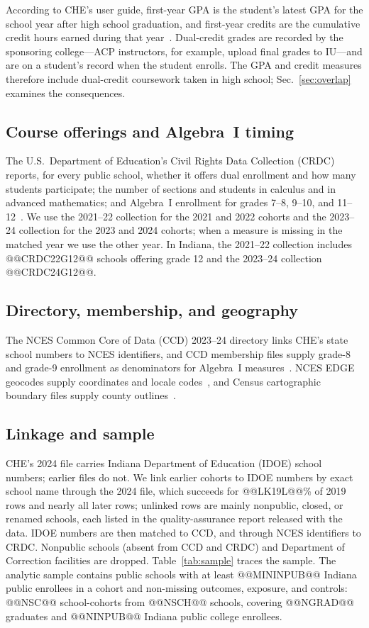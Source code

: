 \documentclass[aps,prd,reprint,superscriptaddress,nofootinbib,floatfix]{revtex4-2}
\begin{document}
According to CHE's user guide, first-year GPA is the student's latest GPA for the school year after high school graduation, and first-year credits are the cumulative credit hours earned during that year~\cite{cheguide}. Dual-credit grades are recorded by the sponsoring college---ACP instructors, for example, upload final grades to IU---and are on a student's record when the student enrolls. The GPA and credit measures therefore include dual-credit coursework taken in high school; Sec.~\ref{sec:overlap} examines the consequences.

\subsection{Course offerings and Algebra~I timing}

The U.S.\ Department of Education's Civil Rights Data Collection (CRDC) reports, for every public school, whether it offers dual enrollment and how many students participate; the number of sections and students in calculus and in advanced mathematics; and Algebra~I enrollment for grades 7--8, 9--10, and 11--12~\cite{crdc}. We use the 2021--22 collection for the 2021 and 2022 cohorts and the 2023--24 collection for the 2023 and 2024 cohorts; when a measure is missing in the matched year we use the other year. In Indiana, the 2021--22 collection includes @@CRDC22G12@@ schools offering grade 12 and the 2023--24 collection @@CRDC24G12@@.

\subsection{Directory, membership, and geography}

The NCES Common Core of Data (CCD) 2023--24 directory links CHE's state school numbers to NCES identifiers, and CCD membership files supply grade-8 and grade-9 enrollment as denominators for Algebra~I measures~\cite{ccd}. NCES EDGE geocodes supply coordinates and locale codes~\cite{edge}, and Census cartographic boundary files supply county outlines~\cite{census}.

\subsection{Linkage and sample}

CHE's 2024 file carries Indiana Department of Education (IDOE) school numbers; earlier files do not. We link earlier cohorts to IDOE numbers by exact school name through the 2024 file, which succeeds for @@LK19L@@\% of 2019 rows and nearly all later rows; unlinked rows are mainly nonpublic, closed, or renamed schools, each listed in the quality-assurance report released with the data. IDOE numbers are then matched to CCD, and through NCES identifiers to CRDC. Nonpublic schools (absent from CCD and CRDC) and Department of Correction facilities are dropped. Table~\ref{tab:sample} traces the sample. The analytic sample contains public schools with at least @@MININPUB@@ Indiana public enrollees in a cohort and non-missing outcomes, exposure, and controls: @@NSC@@ school-cohorts from @@NSCH@@ schools, covering @@NGRAD@@ graduates and @@NINPUB@@ Indiana public college enrollees.
\end{document}
